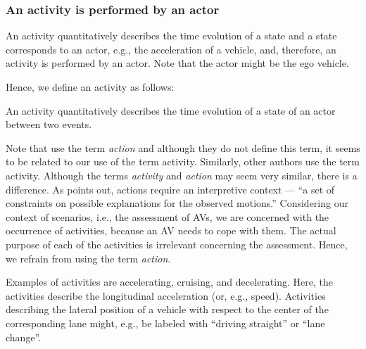 \subsubsection{An activity is performed by an actor}
An activity quantitatively describes the time evolution of a state and a state corresponds to an actor, e.g., the acceleration of a vehicle, and, therefore, an activity is performed by an actor. Note that the actor might be the ego vehicle. 

Hence, we define an activity as follows:
\begin{definition}[Activity]
	\label{def:activity}
	An activity quantitatively describes the time evolution of a state of an actor between two events.
\end{definition}
\cbend


Note that \textcite{geyer2014, ulbrich2015} use the term \emph{action} and although they do not define this term, it seems to be related to our use of the term activity. Similarly, other authors \cite{sigsim2019glossary, catapult2018musicc, elrofai2018scenario} use the term activity. Although the terms \emph{activity} and \emph{action} may seem very similar, there is a difference. As \textcite{bobick1997movement} points out, actions require an interpretive context --- ``a set of constraints on possible explanations for the observed motions.''
\cbstartd 
Considering our context of scenarios, i.e., the assessment of AVs, we are concerned with the occurrence of activities, because an AV needs to cope with them. The actual purpose of each of the activities is irrelevant concerning the assessment. Hence, we refrain from using the term \emph{action}.
\cbend

Examples of activities are accelerating, cruising, and decelerating. Here, the activities describe the longitudinal acceleration (or, e.g., speed). Activities describing the lateral position of a vehicle with respect to the center of the \cbstartb corresponding lane \cbend might, e.g., be labeled with ``driving straight'' or ``lane change''.



